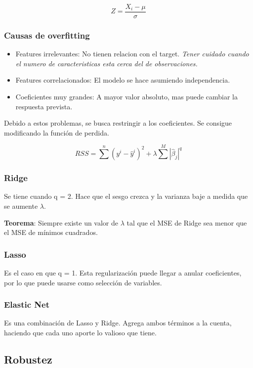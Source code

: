 \documentclass[titlepage,a4paper]{article}
\begin{document}
\begin{equation}
    Z = \frac{X_i - \mu}{\sigma}
\end{equation}

\subsubsection*{Causas de overfitting}
\begin{itemize}
    \item Features irrelevantes: No tienen relacion con el target. \textit{Tener cuidado cuando el numero de caracteristicas esta cerca del de observaciones.}
    \item Features correlacionados: El modelo se hace asumiendo independencia.
    \item Coeficientes muy grandes: A mayor valor absoluto, mas puede cambiar la respuesta prevista.
\end{itemize}

Debido a estos problemas, se busca restringir a los coeficientes. Se consigue modificando la función de perdida.

\begin{equation}
    RSS = \sum^{n} (y^{i}-\hat{y}^{i})^{2} + \lambda \sum^{M} |\hat{\beta}_j|^{q}
\end{equation}

\subsubsection{Ridge}
Se tiene cuando q = 2. Hace que el sesgo crezca y la varianza baje a medida que se aumente $\lambda$.

\textbf{Teorema}: Siempre existe un valor de $\lambda$ tal que el MSE de Ridge sea menor que el MSE de mínimos cuadrados.

\subsubsection{Lasso}
Es el caso en que q = 1. Esta regularización puede llegar a anular coeficientes, por lo que puede usarse como selección de variables.

\subsubsection{Elastic Net}
Es una combinación de Lasso y Ridge. Agrega ambos términos a la cuenta, haciendo que cada uno aporte lo valioso que tiene.

\subsection{Robustez}
\end{document}
